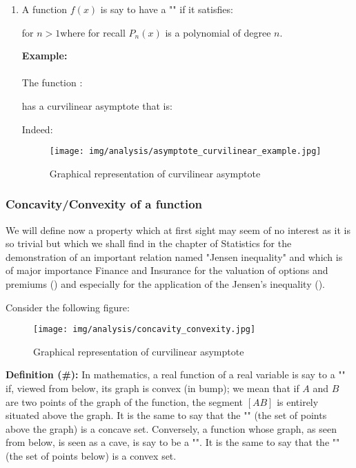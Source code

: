 \begin{enumerate}
\begin{enumerate}
			\item A function $f(x)$ is say to have a "" if it satisfies:
			
			for $n>1 $where for recall $P_n(x)$ is a polynomial of degree $n$.
			\begin{tcolorbox}[colframe=black,colback=white,sharp corners]
			\textbf{{\Large {}}Example:}\\\\
			The function :
			
			has a curvilinear asymptote that is:
			
			Indeed:
			
			 \begin{figure}[H]
				\centering
				\texttt{[image: img/analysis/asymptote\_curvilinear\_example.jpg]}
				\caption[]{Graphical representation of curvilinear asymptote}
			\end{figure}
			\end{tcolorbox}
		\end{enumerate}
	\end{enumerate}
	
	\pagebreak
	\subsubsection{Concavity/Convexity of a function}
	We will define now a property which at first sight may seem of no interest as it is so trivial but which we shall find in the chapter of Statistics for the demonstration of an important relation named "Jensen inequality" and which is of major importance Finance and Insurance for the valuation of options and premiums () and especially for the application of the Jensen's inequality ().

	Consider the following figure:
	\begin{figure}[H]
		\centering
		\texttt{[image: img/analysis/concavity\_convexity.jpg]}
		\caption[]{Graphical representation of curvilinear asymptote}
	\end{figure}
	\textbf{Definition (\#\mydef):} In mathematics, a real function of a real variable is say to a "\label{convex function}" if, viewed from below, its graph is convex (in bump); we mean that if $A$ and $B$ are two points of the graph of the function, the segment $[AB]$ is entirely situated above the graph. It is the same to say that the "" (the set of points above the graph) is a concave set. Conversely, a function whose graph, as seen from below, is seen as a cave, is say to be a "\label{concave function}". It is the same to say that the "" (the set of points below) is a convex set.
	
